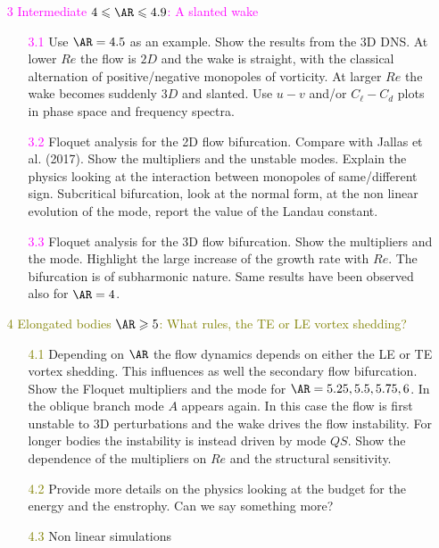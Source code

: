 \begin{itemize}
  \item[\textcolor{Fuchsia}{3}] \textcolor{Fuchsia}{Intermediate $ 4 \le \AR \le 4.9$: A slanted wake}
  \begin{itemize}
    \item[\textcolor{Fuchsia}{3.1}] Use $\AR=4.5$ as an example. Show the results from the 3D DNS. At lower $Re$ the flow is $2D$ and the wake is straight, with the classical alternation of positive/negative monopoles of vorticity. At larger $Re$ the wake becomes suddenly $3D$ and slanted. Use $u-v$  and/or $C_\ell-C_d$ plots in phase space and frequency spectra.
    \item[\textcolor{Fuchsia}{3.2}] Floquet analysis for the 2D flow bifurcation. Compare with Jallas et al. (2017). Show the multipliers and the unstable modes. Explain the physics looking at the interaction between monopoles of same/different sign. Subcritical bifurcation, look at the normal form, at the non linear evolution of the mode, report the value of the Landau constant.
    \item[\textcolor{Fuchsia}{3.3}] Floquet analysis for the 3D flow bifurcation. Show the multipliers and the mode. Highlight the large increase of the growth rate with $Re$. The bifurcation is of subharmonic nature. Same results have been observed also for $\AR=4$.
  \end{itemize}
  
  \item[\textcolor{olive}{4}] \textcolor{olive}{Elongated bodies $\AR \ge 5$: What rules, the TE or LE vortex shedding?}
  \begin{itemize}
    \item[\textcolor{olive}{4.1}] Depending on $\AR$ the flow dynamics depends on either the LE or TE vortex shedding. This influences as well the secondary flow bifurcation. Show the Floquet multipliers and the mode for $\AR=5.25,5.5,5.75,6$. In the oblique branch mode $A$ appears again. In this case the flow is first unstable to 3D perturbations and the wake drives the flow instability. For longer bodies the instability is instead driven by mode $QS$. Show the dependence of the multipliers on $Re$ and the structural sensitivity. 
    \item[\textcolor{olive}{4.2}] Provide more details on the physics looking at the budget for the energy and the enstrophy. Can we say something more?
    \item[\textcolor{olive}{4.3}] Non linear simulations
  \end{itemize}
  
\end{itemize}
    
     

